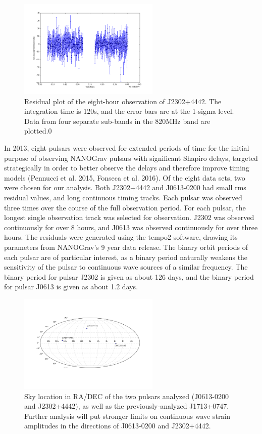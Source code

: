\documentclass[12pt]{article}
\begin{document}
\begin{figure}[h!]
    \caption{Residual plot of the eight-hour observation of J2302+4442. The
integration time is 120s, and the error bars are at the 1-sigma level. Data from
four separate sub-bands in the 820MHz band are plotted.0}
    \includegraphics[width=0.6\textwidth]{./figures/J2302_residuals.png}
\end{figure}

   In 2013, eight pulsars were observed for extended periods of time for the
initial purpose of observing NANOGrav pulsars with significant Shapiro delays,
targeted strategically in order to better observe the delays and therefore
improve timing models (Pennucci et al. 2015, Fonseca et al. 2016). 
Of the eight data sets, two were chosen for our
analysis. Both J2302+4442 and J0613-0200 had small rms residual values, and
long continuous timing tracks.  Each pulsar was observed three times over the
course of the full observation period.  For each pulsar, the longest single
observation track was selected for observation. J2302 was observed continuously
for over 8 hours, and J0613 was observed continuously for over three hours.
The residuals were generated using the tempo2 software, drawing its parameters
from NANOGrav's 9 year data release. The binary orbit periods of each pulsar
are of particular interest, as a binary period naturally weakens the
sensitivity of the pulsar to continuous wave sources of a similar frequency.
The binary period for pulsar J2302 is given as about 126 days, and the binary
period for pulsar J0613 is given as about 1.2 days.

\begin{figure}[h!]
    \caption{Sky location in RA/DEC of the two pulsars analyzed (J0613-0200 and
J2302+4442), as well as the previously-analyzed J1713+0747. Further analysis
will put stronger limits on continuous wave strain amplitudes in the directions
of J0613-0200 and J2302+4442.}
    \includegraphics[width=0.6\textwidth]{./figures/skyplot.png}
\end{figure}
\end{document}
